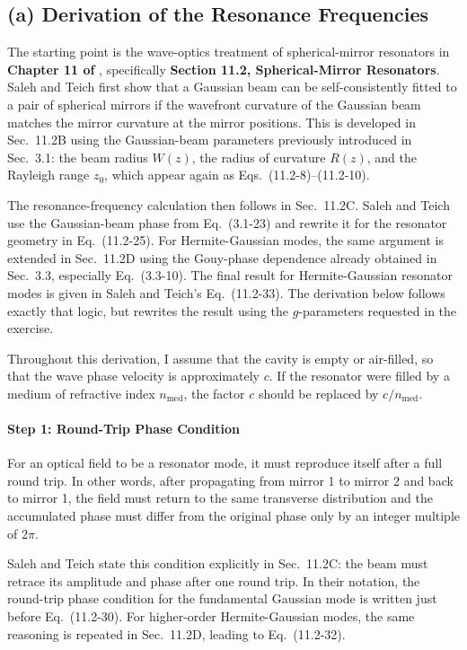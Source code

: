 \begin{resolucao}[Solution]

\subsection*{(a) Derivation of the Resonance Frequencies}

    The starting point is the wave-optics treatment of spherical-mirror resonators in \textbf{Chapter 11 of }, specifically \textbf{Section 11.2, Spherical-Mirror Resonators}. Saleh and Teich first show that a Gaussian beam can be self-consistently fitted to a pair of spherical mirrors if the wavefront curvature of the Gaussian beam matches the mirror curvature at the mirror positions. This is developed in Sec.~11.2B using the Gaussian-beam parameters previously introduced in Sec.~3.1: the beam radius $W(z)$, the radius of curvature $R(z)$, and the Rayleigh range $z_0$, which appear again as Eqs.~(11.2-8)--(11.2-10).

    The resonance-frequency calculation then follows in Sec.~11.2C. Saleh and Teich use the Gaussian-beam phase from Eq.~(3.1-23) and rewrite it for the resonator geometry in Eq.~(11.2-25). For Hermite-Gaussian modes, the same argument is extended in Sec.~11.2D using the Gouy-phase dependence already obtained in Sec.~3.3, especially Eq.~(3.3-10). The final result for Hermite-Gaussian resonator modes is given in Saleh and Teich's Eq.~(11.2-33). The derivation below follows exactly that logic, but rewrites the result using the $g$-parameters requested in the exercise.

    Throughout this derivation, I assume that the cavity is empty or air-filled, so that the wave phase velocity is approximately $c$. If the resonator were filled by a medium of refractive index $n_{\mathrm{med}}$, the factor $c$ should be replaced by $c/n_{\mathrm{med}}$.

    \paragraph*{Step 1: Round-Trip Phase Condition}
        For an optical field to be a resonator mode, it must reproduce itself after a full round trip. In other words, after propagating from mirror 1 to mirror 2 and back to mirror 1, the field must return to the same transverse distribution and the accumulated phase must differ from the original phase only by an integer multiple of $2\pi$.

        Saleh and Teich state this condition explicitly in Sec.~11.2C: the beam must retrace its amplitude and phase after one round trip. In their notation, the round-trip phase condition for the fundamental Gaussian mode is written just before Eq.~(11.2-30). For higher-order Hermite-Gaussian modes, the same reasoning is repeated in Sec.~11.2D, leading to Eq.~(11.2-32).


\end{resolucao}
